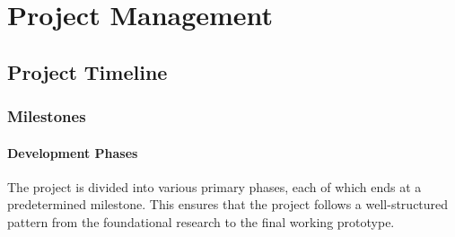 
\chapter{Project Management}

\section{Project Timeline}
\subsection{Milestones}

\subsubsection{Development Phases}
The project is divided into various primary phases, each of which ends at a predetermined milestone. This ensures that the project follows a well-structured pattern from the foundational research to the final working prototype.

